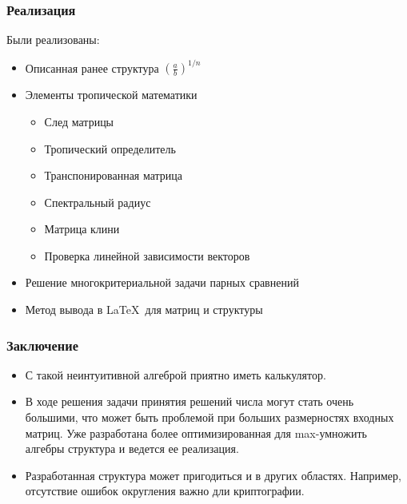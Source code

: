 \documentclass[ucs, notheorems, handout]{beamer}
\begin{document}
\begin{frame}
    \frametitle{Реализация}
    
    Были реализованы:
    \begin{itemize}
        \item Описанная ранее структура $ \left(\frac{a}{b}\right)^{1/n}$
        \item Элементы тропической математики
        \begin{itemize}
            \item След матрицы
            \item Тропический определитель
            \item Транспонированная матрица
            \item Спектральный радиус
            \item Матрица клини
            \item Проверка линейной зависимости векторов
        \end{itemize}
        \item Решение многокритериальной задачи парных сравнений
        \item Метод вывода в \LaTeX \, для матриц и структуры
    \end{itemize}
\end{frame}

    

\begin{frame}
    \frametitle{Заключение}
    \begin{itemize}
        \item С такой неинтуитивной алгеброй приятно иметь калькулятор.
        
        \item В ходе решения задачи принятия решений числа могут стать очень большими, что может быть проблемой при больших размерностях входных матриц. Уже разработана более оптимизированная для max-умножить алгебры структура и ведется ее реализация.
        
        \item Разработанная структура может пригодиться и в других областях. Например, отсутствие ошибок округления важно дли криптографии.
    \end{itemize}
\end{frame}
\end{document}
